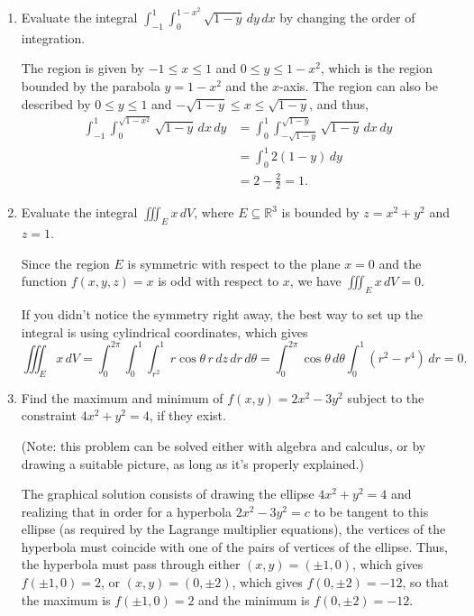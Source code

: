 \documentclass[12pt]{article}
\newcommand{\points}[1]{\marginpar{\hspace{24pt}[#1]}}
\newcommand{\di}{\displaystyle}
\begin{document}
\begin{enumerate}
\item Evaluate the integral $\di \int_{-1}^1\int_0^{1-x^2}\sqrt{1-y}\, dy\,dx$ by changing the order of integration. \points{6}

\bigskip

The region is given by $-1\leq x\leq 1$ and $0\leq y\leq 1-x^2$, which is the region bounded by the parabola $y=1-x^2$ and the $x$-axis. The region can also be described by $0\leq y\leq 1$ and $-\sqrt{1-y}\leq x\leq\sqrt{1-y}$, and thus,
\begin{align*}
 \int_{-1}^1\int_0^{\sqrt{1-x^2}}\sqrt{1-y}\, dx\,dy & = \int_0^1\int_{-\sqrt{1-y}}^{\sqrt{1-y}}\sqrt{1-y}\,dx\,dy\\
& = \int_0^1 2(1-y)\,dy\\
& = 2-\frac{2}{2} = 1.
\end{align*}


\bigskip


\item Evaluate the integral $\di \iiint_E x\,dV$, where $E\subseteq\mathbb{R}^3$ is bounded by $z=x^2+y^2$ and $z=1$. \points{5}

\bigskip

Since the region $E$ is symmetric with respect to the plane $x=0$ and the function $f(x,y,z)=x$ is odd with respect to $x$, we have $\di \iiint_E x\,dV=0$.

\medskip

If you didn't notice the symmetry right away, the best way to set up the integral is using cylindrical coordinates, which gives
\[
 \iiint_E x\,dV = \int_0^{2\pi}\int_0^1\int_{r^2}^{1}r\cos\theta\, r\,dz\,dr\,d\theta = \int_0^{2\pi}\cos\theta\, d\theta\int_0^1(r^2-r^4)\, dr = 0.
\]
\newpage

\item Find the maximum and minimum of $f(x,y)=2x^2-3y^2$ subject to the constraint $4x^2+y^2=4$, if they exist. \points{7}

(Note: this problem can be solved either with algebra and calculus, or by drawing a suitable picture, as long as it's properly explained.)

\bigskip

The graphical solution consists of drawing the ellipse $4x^2+y^2=4$ and realizing that in order for a hyperbola $2x^2-3y^2=c$ to be tangent to this ellipse (as required by the Lagrange multiplier equations), the vertices of the hyperbola must coincide with one of the pairs of vertices of the ellipse. Thus, the hyperbola must pass through either $(x,y) = (\pm 1, 0)$, which gives $f(\pm 1, 0) = 2$, or $(x,y) = (0,\pm 2)$, which gives $f(0,\pm 2) = -12$, so that the maximum is $f(\pm 1,0)=2$ and the minimum is $f(0, \pm 2) = -12$.


\end{enumerate}
\end{document}
